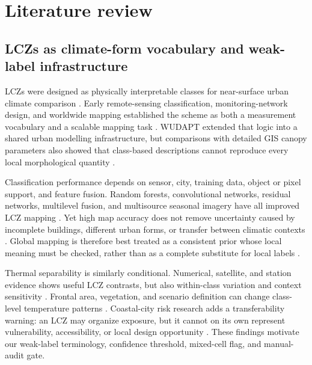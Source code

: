 ﻿\section{Literature review}\label{sec:literature}

\subsection{LCZs as climate-form vocabulary and weak-label infrastructure}

LCZs were designed as physically interpretable classes for near-surface urban
climate comparison \citep{stewart2012LocalClimate}. Early remote-sensing
classification, monitoring-network design, and worldwide mapping established
the scheme as both a measurement vocabulary and a scalable mapping task
\citep{bechtel2012ClassifiLocal,lelovics2014DesignUrban,
bechtel2015MappingLocal}. WUDAPT extended that logic into a shared urban
modelling infrastructure, but comparisons with detailed GIS canopy parameters
also showed that class-based descriptions cannot reproduce every local
morphological quantity \citep{ching2018WudaptUrban,
hammerberg2018ImplicatEmployin,zonato2020EvaluatiPerforma}.

Classification performance depends on sensor, city, training data, object or
pixel support, and feature fusion. Random forests, convolutional networks,
residual networks, multilevel fusion, and multisource seasonal imagery have all
improved LCZ mapping \citep{qiu2018FeatureImportan,yoo2019ComparisBetween,
qiu2020MultilevFeature,yoo2020ImprovinLocal,wang2023LocalClimate}. Yet high
map accuracy does not remove uncertainty caused by incomplete buildings,
different urban forms, or transfer between climatic contexts
\citep{wang2018AssessinLocal,yoo2020ImprovinLocal,
yan2022ComparinObject}. Global mapping is therefore best treated as a
consistent prior whose local meaning must be checked, rather than as a complete
substitute for local labels \citep{demuzere2022GlobalLocal}.

Thermal separability is similarly conditional. Numerical, satellite, and
station evidence shows useful LCZ contrasts, but also within-class variation
and context sensitivity \citep{geletic2016LandSurface,skarbit2017EmployinUrban,
kwok2019WellDoes,yang2020InvestigDiversit}. Frontal area, vegetation, and
scenario definition can change class-level temperature patterns
\citep{li2022VariabilLand,zhou2023IdentifyEffects,
deng2024SensitivLocal}. Coastal-city risk research adds a transferability
warning: an LCZ may organize exposure, but it cannot on its own represent
vulnerability, accessibility, or local design opportunity
\citep{ma2023InvestigUrban,zhang2025ApplicabLocal}. These findings motivate our
weak-label terminology, confidence threshold, mixed-cell flag, and manual-audit
gate.

